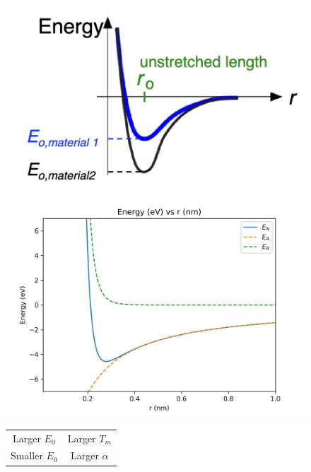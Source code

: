 \documentclass{article}
\begin{document}
\begin{figure}[H]
    \centering
    \begin{minipage}{0.4\textwidth}
        \centering
        \includegraphics[width=\textwidth]{energy.png}
    \end{minipage}
    \hfill
    \begin{minipage}{0.4\textwidth}
        \centering
        \includegraphics[width=\textwidth]{2a.png}
    \end{minipage}
    \hfill
    \begin{minipage}{0.2\textwidth}
        \centering
        \begin{tabular}{ c | c }
            Larger $E_0$ & Larger $T_m$ \\
            Smaller $E_0$ & Larger $\alpha$ \\
        \end{tabular}
    \end{minipage}
\end{figure}
\end{document}
